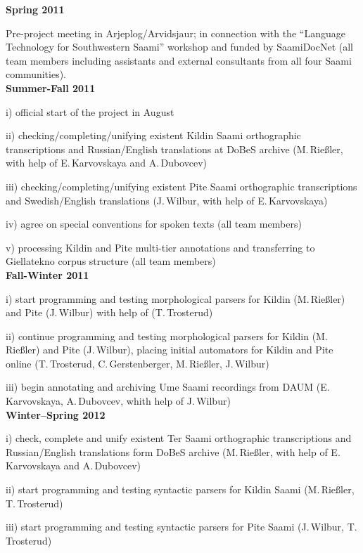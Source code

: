 \documentclass[a4paper,12pt]{article}
\begin{document}
{{\noindent \textbf{Spring 2011}

Pre-project meeting in Arjeplog/Arvidsjaur; in connection with the “Language Technology for Southwestern Saami” workshop and funded by SaamiDocNet (all team members including assistants and external consultants from all four Saami communities).\\

\noindent \textbf{Summer-Fall 2011}

i) official start of the project in August

ii) checking/completing/unifying existent Kildin Saami orthographic transcriptions and Russian/English translations at DoBeS archive (M.\,Rießler, with help of E.\,Karvovskaya and A.\,Dubovcev)

iii) checking/completing/unifying existent Pite Saami orthographic transcriptions and Swedish/English translations (J.\,Wilbur, with help of E.\,Karvovskaya)

iv) agree on special conventions for spoken texts (all team members)

v) processing Kildin and Pite multi-tier annotations and transferring to Giellatekno corpus structure (all team members)\\

\noindent \textbf{Fall-Winter 2011}

i) start programming and testing morphological parsers for Kildin (M.\,Rießler) and Pite (J.\,Wilbur) with help of (T.\,Trosterud)

ii) continue programming and testing morphological parsers for Kildin (M.\,Rießler) and Pite (J.\,Wilbur), placing initial automators for Kildin and Pite online (T.\,Trosterud, C.\,Gerstenberger, M.\,Rießler, J.\,Wilbur)

iii) begin annotating and archiving Ume Saami recordings from DAUM (E.\,Karvovskaya, A.\,Dubovcev, whith help of J.\,Wilbur)\\

\noindent \textbf{Winter–Spring 2012}

i) check, complete and unify existent Ter Saami orthographic transcriptions and Russian/English translations form DoBeS archive (M.\,Rießler, with help of E.\,Karvovskaya and A.\,Dubovcev)

ii) start programming and testing syntactic parsers for Kildin Saami (M.\,Rießler, T.\,Trosterud)

iii) start programming and testing syntactic parsers for Pite Saami (J.\,Wilbur, T.\,Trosterud)\\

}}
\end{document}
